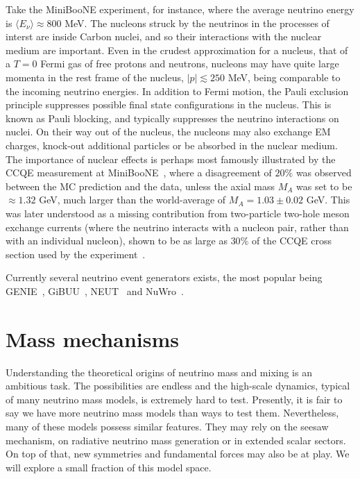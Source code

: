 Take the MiniBooNE experiment, for instance, where the average neutrino energy is $\langle E_\nu \rangle \approx 800 $ MeV. The nucleons struck by the neutrinos in the processes of interst are inside Carbon nuclei, and so their interactions with the nuclear medium are important. Even in the crudest approximation for a nucleus, that of a $T=0$ Fermi gas of free protons and neutrons, nucleons may have quite large momenta in the rest frame of the nucleus, $|p| \lesssim 250$ MeV, being comparable to the incoming neutrino energies. In addition to Fermi motion, the Pauli exclusion principle suppresses possible final state configurations in the nucleus. This is known as Pauli blocking, and typically suppresses the neutrino interactions on nuclei. On their way out of the nucleus, the nucleons may also exchange EM charges, knock-out additional particles or be absorbed in the nuclear medium. The importance of nuclear effects is perhaps most famously illustrated by the CCQE measurement at MiniBooNE~\cite{AguilarArevalo:2010zc}, where a disagreement of $20\%$ was observed between the MC prediction and the data, unless the axial mass $M_A$ was set to be $\approx1.32$ GeV, much larger than the world-average of $M_A = 1.03 \pm 0.02$ GeV. This was later understood as a missing contribution from two-particle two-hole meson exchange currents (where the neutrino interacts with a nucleon pair, rather than with an individual nucleon), shown to be as large as $30\%$ of the CCQE cross section used by the experiment~\cite{Nieves:2011yp}.

Currently several neutrino event generators exists, the most popular being GENIE~\cite{Andreopoulos:2009rq}, GiBUU~\cite{Buss:2011mx}, NEUT~\cite{Hayato:2002sd} and NuWro~\cite{Juszczak:2005zs}.

%
%
%
%
%
\section{Mass mechanisms}

Understanding the theoretical origins of neutrino mass and mixing is an ambitious task. The possibilities are endless and the high-scale dynamics, typical of many neutrino mass models, is extremely hard to test. Presently, it is fair to say we have more neutrino mass models than ways to test them. Nevertheless, many of these models possess similar features. They may rely on the seesaw mechanism, on radiative neutrino mass generation or in extended scalar sectors. On top of that, new symmetries and fundamental forces may also be at play. We will explore a small fraction of this model space.

